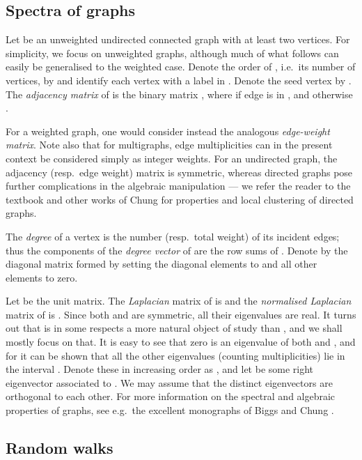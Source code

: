 \documentclass{article}
\begin{document}
\subsection{Spectra of graphs}

Let  be an unweighted undirected connected graph with at
least two vertices.  For simplicity, we focus on unweighted graphs,
although much of what follows can easily be generalised to the
weighted case.  Denote the order of , i.e.\ its number of vertices,
by  and identify each vertex  with a label in .  Denote the seed vertex by .  The \emph{adjacency matrix} of
 is the binary matrix , where  if edge  is
in , and otherwise .  

For a weighted graph, one would consider instead the analogous
\emph{edge-weight matrix}. Note also that for multigraphs, edge
multiplicities can in the present context be considered simply as
integer weights. For an undirected graph, the adjacency (resp.\ edge
weight) matrix is symmetric, whereas directed graphs pose further
complications in the algebraic manipulation --- we refer the reader to
the textbook and other works of Chung
\cite{Chun97,dirlocal,AnCh07,heatkernel} for properties and local
clustering of directed graphs.

The \emph{degree}  of a vertex  is the number (resp.\ total
weight) of its incident edges; thus the components of the \emph{degree
vector}  of  are the row sums of .  Denote by  the
diagonal  matrix formed by setting the diagonal elements
to  and all other elements to zero.

Let  be the  unit matrix. The \emph{Laplacian} matrix
of  is  and the \emph{normalised Laplacian} matrix of
 is .  Since both  and  are symmetric, all their
eigenvalues are real.  It turns out that  is in some respects a
more natural object of study than , and we shall mostly focus on
that. It is easy to see that zero is an eigenvalue of both  and
, and for  it can be shown that all the other 
eigenvalues (counting multiplicities) lie in the interval .
Denote these in increasing order as , and let  be some right
eigenvector associated to . We may assume that the distinct
eigenvectors  are orthogonal to each other.  For more
information on the spectral and algebraic properties of graphs, see
e.g.\ the excellent monographs of Biggs \cite{Bigg94} and Chung
\cite{Chun97}.


\subsection{Random walks}
\label{sec:random walks}
\end{document}
